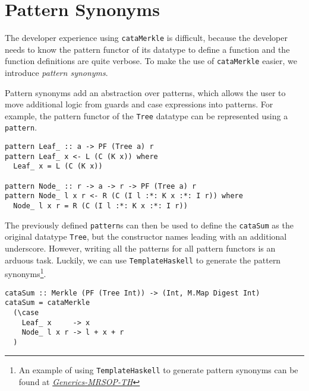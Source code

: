 \section{Pattern Synonyms}

The developer experience using \texttt{cataMerkle} is difficult, because the developer needs to know the pattern functor of its datatype to define a function and the function definitions are quite verbose. To make the use of \texttt{cataMerkle} easier, we introduce \textit{pattern synonyms}\cite{pickering2016pattern}. 

Pattern synonyms add an abstraction over patterns, which allows the user to move additional logic from guards and case expressions into patterns. For example, the pattern functor of the \texttt{Tree} datatype can be represented using a \texttt{pattern}.

\begin{verbatim}
pattern Leaf_ :: a -> PF (Tree a) r
pattern Leaf_ x <- L (C (K x)) where
  Leaf_ x = L (C (K x))

pattern Node_ :: r -> a -> r -> PF (Tree a) r
pattern Node_ l x r <- R (C (I l :*: K x :*: I r)) where
  Node_ l x r = R (C (I l :*: K x :*: I r))
\end{verbatim}

The previously defined \texttt{pattern}s can then be used to define the \texttt{cataSum} as the original datatype \texttt{Tree}, but the constructor names leading with an additional underscore. However, writing all the patterns for all pattern functors is an arduous task. Luckily, we can use \texttt{TemplateHaskell} to generate the pattern synonyms\footnote{An example of using \texttt{TemplateHaskell} to generate pattern synonyms can be found at \href{https://hackage.haskell.org/package/generics-mrsop-2.3.0/docs/Generics-MRSOP-TH.html}{\textit{Generics-MRSOP-TH}}}.

\begin{verbatim}
cataSum :: Merkle (PF (Tree Int)) -> (Int, M.Map Digest Int)
cataSum = cataMerkle
  (\case
    Leaf_ x     -> x
    Node_ l x r -> l + x + r
  )
\end{verbatim}